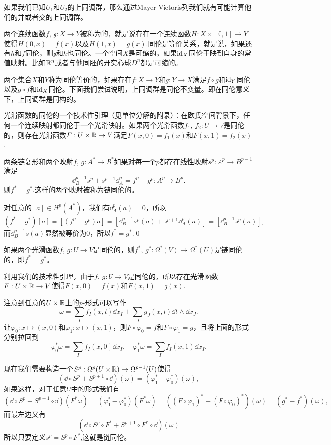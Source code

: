 如果我们已知$U_1$和$U_2$的上同调群，那么通过Mayer-Vietoris列我们就有可能计算他们的并或者交的上同调群。

\para \label{homotopy}两个连续函数$f$, $g:X\to Y$被称为的，就是说存在一个连续函数$H:X\times [0,1]\to Y$使得$H(0,x)=f(x)$以及$H(1,x)=g(x)$.同伦是等价关系，就是说，如果还有$h$和$f$同伦，则$g$和$h$也同伦。一个空间$X$是可缩的，如果$\operatorname{id}_X$同伦于映到自身的常值映射。比如$\mathbb{R}^n$或者与他同胚的开实心球$D^n$都是可缩的。

两个集合$X$和$Y$称为同伦等价的，如果存在$f:X\to Y$和$g:Y\to X$满足$f\circ g$和$\operatorname{id}_Y$同伦以及$g\circ f$和$\operatorname{id}_X$同伦。下面我们尝试说明，上同调群是同伦不变量。即在同伦意义下，上同调群是同构的。

\lem 光滑函数的同伦的一个技术性引理（见单位分解的附录）：在欧氏空间背景下，任何一个连续映射都同伦于一个光滑映射。如果两个光滑函数$f_1$, $f_2:U\to V$是同伦的，则存在光滑函数$F:U\times \mathbb{R}\to V$满足$F(x,0)=f_1(x)$和$F(x,1)=f_2(x)$.

\pro 两条链复形和两个映射$f$, $g:A^*\to B^*$如果对每一个$p$都存在线性映射$s^p:A^p \to B^{p-1}$满足
\[
\dd_B^{p-1}s^p+s^{p+1}\dd_A^p=f^p-g^p:A^p\to B^p.
\]
则$f^*=g^*$.这样的两个映射被称为链同伦的。

\proof 对任意的$[a]\in H^p(A^*)$，我们有$\dd_A^p(a)=0$，所以
\[
(f^*-g^*)[a]=[(f^p-g^p)a]=[\dd^{p-1}_Bs^p(a)+s^{p+1}\dd_A^p(a)]=[\dd^{p-1}_Bs^p(a)],
\]
而$\dd^{p-1}_Bs(a)$显然被等价为0，所以$f^*=g^*$.\qed

\pro 如果两个光滑函数$f$, $g:U\to V$是同伦的，则$
f^*$, $g^*:\Omega^*(V)\to \Omega^*(U)$是链同伦的，即$f^*=g^*$。

\proof 利用我们的技术性引理，由于$f$, $g:U\to V$是同伦的，所以存在光滑函数$F:U\times \mathbb{R} \to V$使得$F(x,0)=f(x)$和$F(x,1)=g(x)$.

注意到任意的$U\times \mathbb{R}$上的$p$-形式可以写作
\[
\omega=\sum_If_I(x,t)\dd x_I+\sum_J g_J(x,t)\dd t\wedge \dd x_J.
\]
让$\varphi_0:x\mapsto (x,0)$和$\varphi_1:x\mapsto (x,1)$，则$F\circ \varphi_0=f$和$F\circ \varphi_1=g$，且将上面的形式分别拉回到
\[
\varphi_0^*\omega=\sum_I f_I(x,0)\dd x_I,\quad
\varphi_1^*\omega=\sum_I f_I(x,1)\dd x_I.
\]

现在我们需要构造一个$S^p:\Omega^p(U\times \mathbb{R})\to \Omega^{p-1}(U)$使得
\[
(\dd \circ S^p+S^{p+1}\circ \dd)(\omega)=(\varphi_1^*-\varphi_0^*)(\omega),
\]
如果这样，对于任意$U$中的形式我们有
\[
(\dd \circ S^p+S^{p+1}\circ \dd)(F^*\omega)=(\varphi_1^*-\varphi_0^*)(F^*\omega)=((F\circ \varphi_1)^*-(F\circ \varphi_0)^*)(\omega)=(g^*-f^*)(\omega),
\]
而最左边又有
\[
(\dd \circ S^p\circ F^*+S^{p+1}\circ F^* \circ \dd)(\omega)
\]
所以只要定义$s^p=S^p\circ F^*$,这就是链同伦。

